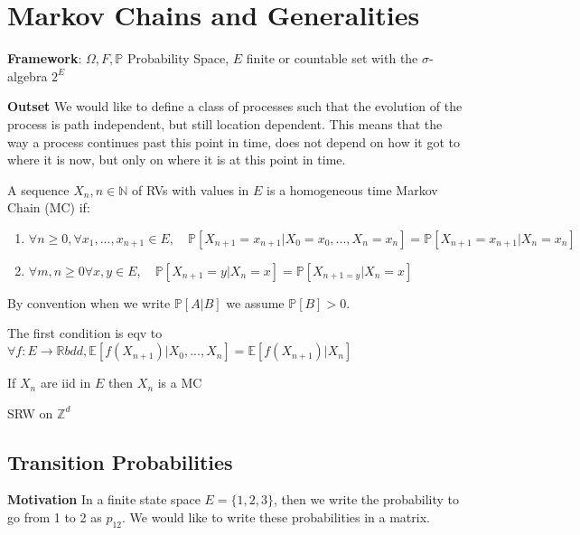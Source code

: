\chapter{Markov Chains and Generalities}
\textbf{Framework}: $\Omega, F, \mathbb{P}$ Probability Space, $E$ finite or countable set with the $\sigma$-algebra $2^E$

\noindent
\textbf{Outset} We would like to define a class of processes such that the evolution of the process is path independent, but still location dependent. This means that the way a process continues past this point in time, does not depend on how it got to where it is now, but only on where it is at this point in time. 

\begin{defn}
	A sequence $X_n, n \in \mathbb{N}$ of RVs with values in $E$ is a homogeneous time Markov Chain (MC) if:
\begin{enumerate}
    \item  $\forall n \geq 0, \forall x_1,...,x_{n+1}\in E, \quad \mathbb{P} \left[ X_{n+1}=x_{n+1} | X_0=x_0,...,X_n=x_n \right] = \mathbb{P} \left[ X_{n+1}=x_{n+1} | X_n = x_n \right] $
	\item $\forall m,n \geq 0 \forall x,y \in E, \quad \mathbb{P} \left[ X_{n+1}=y | X_{n}=x \right] = \mathbb{P} \left[ X_{n+1=y}| X_n=x \right] $
\end{enumerate}

\end{defn}


By convention when we write $\mathbb{P} \left[ A|B \right] $ we assume $\mathbb{P} \left[ B \right] >0$.

\begin{rmk}
The first condition is eqv to $\forall f:E\to \mathbb{R} bdd, \mathbb{E} \left[ f(X_{n+1}) | X_0,...,X_n \right] = \mathbb{E} \left[ f(X_{n+1}) | X_n \right] $
\end{rmk}

\begin{ex}
	If $X_n$ are iid in $E$ then $X_n$ is a MC
\end{ex}

\begin{ex}
	SRW on $\mathbb{Z}^d$
\end{ex}

\section{Transition Probabilities}
\textbf{Motivation} In a finite state space $E=\{1,2,3\}$, then we write the probability to go from 1 to 2 as $p_{12}$. We would like to write these probabilities in a matrix.

